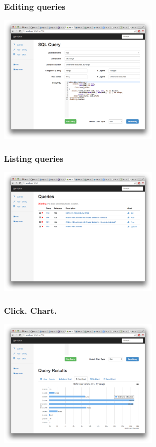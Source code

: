 \documentclass{beamer}
\begin{document}
\begin{frame}
  \frametitle{Editing queries}

  \begin{center}
    \includegraphics[height=2.5in]{pgcharts-query.png}
  \end{center}
\end{frame}

\begin{frame}
  \frametitle{Listing queries}

  \begin{center}
    \includegraphics[height=2.5in]{pgcharts-query-list.png}
  \end{center}
\end{frame}

\begin{frame}
  \frametitle{Click. Chart.}

  \begin{center}
    \includegraphics[height=2.5in]{pgcharts-bar-chart.png}
  \end{center}
\end{frame}
\end{document}
